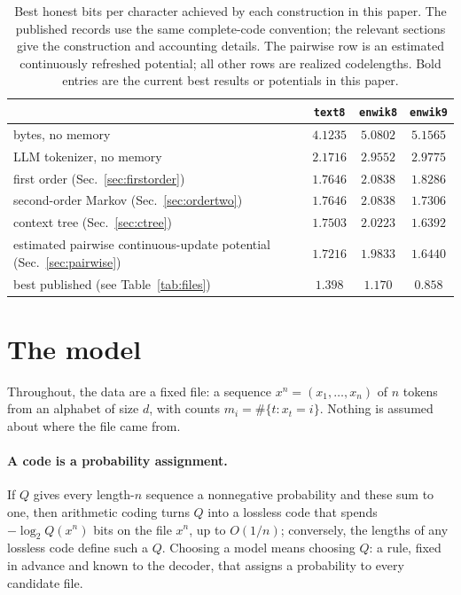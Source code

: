 \documentclass[11pt]{article}
\begin{document}
\begin{table}[ht]
\centering
\begin{tabular}{lccc}
\toprule
 & \texttt{text8} & \texttt{enwik8} & \texttt{enwik9} \\
\midrule
bytes, no memory                & $4.1235$ & $5.0802$ & $5.1565$ \\
LLM tokenizer, no memory        & $2.1716$ & $2.9552$ & $2.9775$ \\
first order (Sec.~\ref{sec:firstorder})   & $1.7646$ & $2.0838$ & $1.8286$ \\
second-order Markov (Sec.~\ref{sec:ordertwo}) & $1.7646$ & $2.0838$ & $1.7306$ \\
context tree (Sec.~\ref{sec:ctree})       & $1.7503$ & $2.0223$ & $\mathbf{1.6392}$ \\
estimated pairwise continuous-update potential (Sec.~\ref{sec:pairwise})
                                         & $\mathbf{1.7216}$ & $\mathbf{1.9833}$ & $1.6440$ \\
\midrule
best published (see Table~\ref{tab:files}) & $1.398$  & $1.170$  & $0.858$ \\
\bottomrule
\end{tabular}
\caption{Best honest bits per character achieved by each construction in
  this paper.  The published records use the same complete-code convention;
  the relevant sections give the construction and accounting details.  The
  pairwise row is an estimated continuously refreshed potential; all other
  rows are realized codelengths.  Bold entries are the current best results or
  potentials in this paper.}
\label{tab:scoreboard}
\end{table}

\section{The model}
\label{sec:setup}

Throughout, the data are a fixed file: a sequence
$x^n = (x_1, \dots, x_n)$ of $n$ tokens from an alphabet of size $d$,
with counts $m_i = \#\{t : x_t = i\}$.  Nothing is assumed about where
the file came from.

\paragraph{A code is a probability assignment.}  If $Q$ gives every
length-$n$ sequence a nonnegative probability and these sum to one,
then arithmetic coding turns $Q$ into a lossless code that spends
$-\log_2 Q(x^n)$ bits on the file $x^n$, up to $O(1/n)$; conversely,
the lengths of any lossless code define such a $Q$.  Choosing a model
means choosing $Q$: a rule, fixed in advance and known to the
decoder, that assigns a probability to every candidate file.
\end{document}
